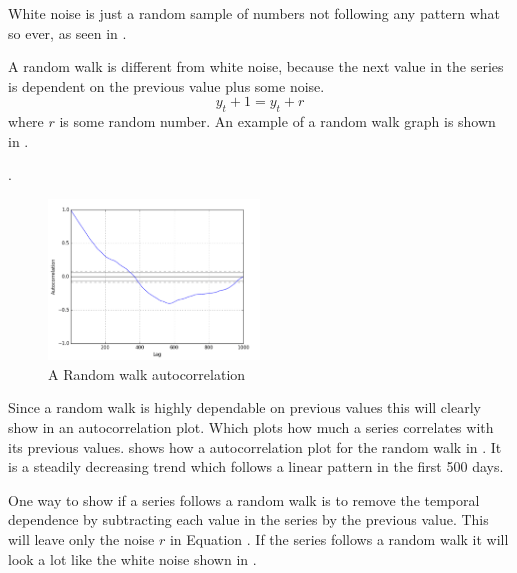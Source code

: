 White noise is just a random sample of numbers not following any pattern what so ever, as seen in
.

A random walk is different from white noise, because the next value in the series is dependent on the previous value plus some noise.
\begin{equation}
  y_t+1 = y_t + r
  \label{eq:random_walk}
\end{equation}
where $r$ is some random number.
An example of a random walk graph is shown in .

.
\begin{figure}[H]
  \centering
  \includegraphics[width=0.5\textwidth]{./figs/illustrations/random_walk_autocorrelation.png}
  \hfill
  \caption{A Random walk autocorrelation}
  \label{fig:dataset:random_walk_autocorrelation}
\end{figure}

Since a random walk is highly dependable on previous values this will clearly show in an autocorrelation plot.
Which plots how much a series correlates with its previous values.
 shows how a autocorrelation plot for the random walk in .
It is a steadily decreasing trend which follows a linear pattern in the first 500 days.

One way to show if a series follows a random walk is to remove the temporal dependence by subtracting each value in the series by the previous value.
This will leave only the noise $r$ in Equation .
If the series follows a random walk it will look a lot like the white noise shown in .

